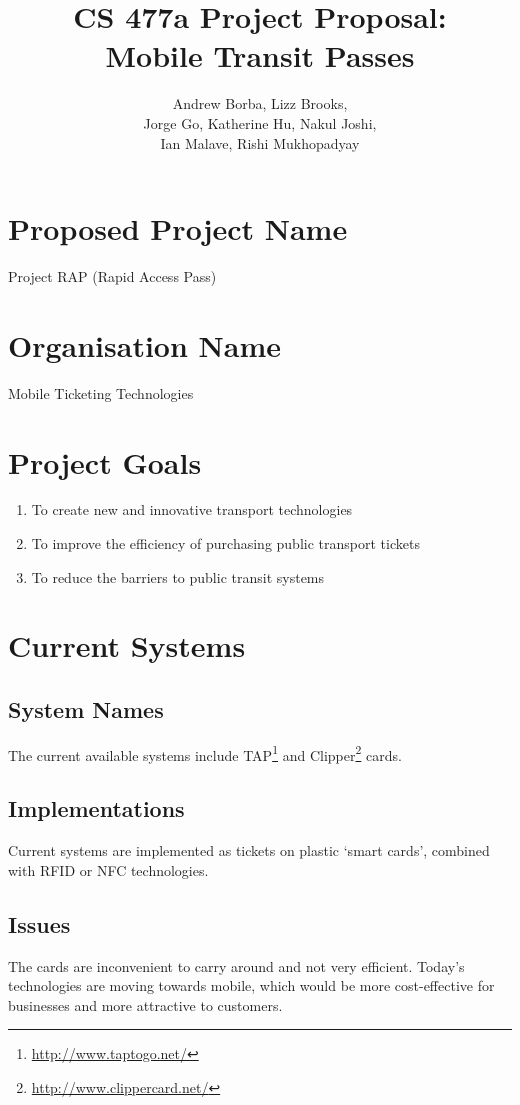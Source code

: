\documentclass{article}
\title{CS 477a Project Proposal: \\Mobile Transit Passes}
\date{}
\author{
	Andrew Borba,
	Lizz Brooks,\\
	Jorge Go,
	Katherine Hu,
	Nakul Joshi,\\
	Ian Malave,
	Rishi Mukhopadyay
}
\begin{document}
\maketitle

\section{Proposed Project Name}
Project RAP (Rapid Access Pass)

\section{Organisation Name}
Mobile Ticketing Technologies

\section{Project Goals}
\begin{enumerate}
	\item To create new and innovative transport technologies
	\item To improve the efficiency of purchasing public transport tickets
	\item To reduce the barriers to public transit systems
\end{enumerate}

\section{Current Systems}
	\subsection{System Names}
		The current available systems include TAP\footnote{\url{http://www.taptogo.net/}} and Clipper\footnote{\url{http://www.clippercard.net/}} cards.
	\subsection{Implementations}
		Current systems are implemented as tickets on plastic `smart cards', combined with RFID or NFC technologies.
	\subsection{Issues}
		The cards are inconvenient to carry around and not very efficient. Today's technologies are moving towards mobile, which would be more cost-effective for businesses and more attractive to customers.
\end{document}
